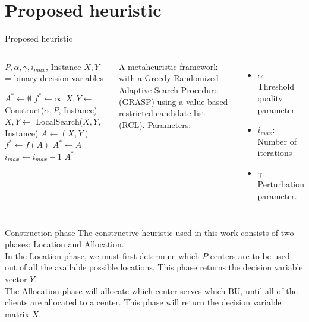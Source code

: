 \documentclass{beamer}
\begin{document}
\section{Proposed heuristic}

\begin{frame}{Proposed heuristic}
    \begin{columns}
        \begin{algorithmic}[1]
        
        \REQUIRE $P, \alpha, \gamma, i_{max}$, Instance
        \ENSURE $X,Y$ = binary decision variables
        
        \STATE $A^* \gets \emptyset$
        \STATE $f^* \gets \infty$
            \STATE $X, Y \gets$ Construct($\alpha, P$, Instance)
            \STATE $X, Y \gets$ LocalSearch($X, Y,$ Instance)
            \STATE $A \gets (X, Y)$
                \STATE $f^* \gets f(A)$
                \STATE $A^* \gets A$ 
            \ENDIF
            \STATE $i_{max} \gets i_{max} - 1$
        \ENDWHILE
        \RETURN $A^*$
        
        \end{algorithmic}
        
        A metaheuristic framework with a Greedy Randomized Adaptive Search Procedure (GRASP) using a value-based restricted candidate list (RCL).
        Parameters:
        \begin{itemize}
            \item $\alpha$: Threshold quality parameter
            \item $i_{max}$: Number of iterations
            \item $\gamma$: Perturbation parameter.
        \end{itemize}
    \end{columns}
\end{frame}

\begin{frame}{Construction phase}
    The constructive heuristic used in this work consists of two phases: Location and Allocation. \\
    In the Location phase, we must first determine which $P$ centers are to be used out of all the available possible locations. This phase returns the decision variable vector $Y$. \\
    The Allocation phase will allocate which center serves which BU, until all of the clients are allocated to a center. This phase will return the decision variable matrix $X$. \\
\end{frame}
\end{document}
